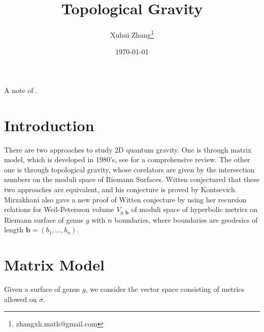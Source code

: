 \documentclass[10pt,reqno,draft]{article}
\title{Topological Gravity}
\author[1]{Xuhui Zhang\thanks{zhangxh.math@gmail.com}}
\affil[1]{Department of Mathematical Science, Tsinghua University}
\date{\today}
\numberwithin{equation}{section}
\numberwithin{figure}{section}
\numberwithin{table}{section}
\theoremstyle{plain}
\theoremstyle{definition}
\theoremstyle{remark}
\begin{document}
    \maketitle
    A note of \cite{dijkgraafDevelopmentsTopologicalGravity2018}.
    \section{Introduction}
    There are two approaches to study 2D quantum gravity. One is through matrix model, which is developed in 1980's, see \cite{francesco2DGravityRandom1995} for a comprehensive review. The other one is through topological gravity, whose corelators are given by the intersection numbers on the moduli space of Riemann Surfaces. Witten conjectured that these two approaches are equivalent\cite{wittenStructureTopologicalPhase1990,wittenTwodimensionalGravityIntersection1990}, and his conjecture is proved by Kontsevich\cite{kontsevichIntersectionTheoryModuli1992}. Mirzakhani also gave a new proof of Witten conjecture by using her recursion relations for Weil-Petersson volume \(V_{g,\boldsymbol{b}}\) of moduli space of hyperbolic metrics on Riemann surface of genus \(g\) with \(n\) boundaries, where boundaries are geodesics of length \(\boldsymbol{b}=(b_1,\dots ,b_{n})\).
    \section{Matrix Model}
    Given a surface of genus \(g\), we consider the vector space consisting of metrics allowed on \(\sigma\).




    
    
\end{document}
